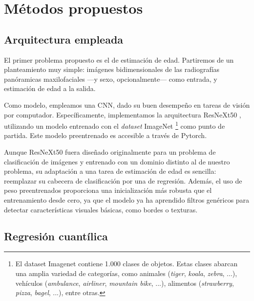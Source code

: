 
\section{Métodos propuestos}

\subsection{Arquitectura empleada}

El primer problema propuesto es el de estimación de edad. Partiremos de un planteamiento muy simple: imágenes 
bidimensionales de las radiografías panóramicas maxilofaciales ---y sexo, opcionalmente---
como entrada, y estimación de edad a la salida.

Como modelo, empleamos una CNN, dado su buen desempeño en tareas de visión por computador. Específicamente,
implementamos la arquitectura ResNeXt50 \cite{xie2017}, utilizando un modelo entrenado con el \textit{dataset} 
ImageNet
\footnote{
    El dataset Imagenet contiene 1.000 clases de objetos. Estas clases abarcan una
    amplia variedad de categorías, como animales (\textit{tiger}, \textit{koala}, \textit{zebra}, ...), 
    vehículos (\textit{ambulance}, \textit{airliner}, \textit{mountain bike}, ...), alimentos 
    (\textit{strawberry}, \textit{pizza}, \textit{bagel}, ...), entre otras. 
}
\cite{deng2009} como punto de partida. Este modelo preentrenado es accesible a través de Pytorch. 

Aunque ResNeXt50 fuera diseñado originalmente para un problema de clasificación de imágenes y entrenado con
un dominio distinto al de nuestro problema, su adaptación a una tarea de estimación de edad es sencilla: 
reemplazar su cabecera de clasificación por una de regresión. Además, el uso de peso preentrenados proporciona
una inicialización más robusta que el entrenamiento desde cero, ya que el modelo ya ha aprendido filtros 
genéricos para detectar características visuales básicas, como bordes o texturas.


\subsection{Regresión cuantílica}

